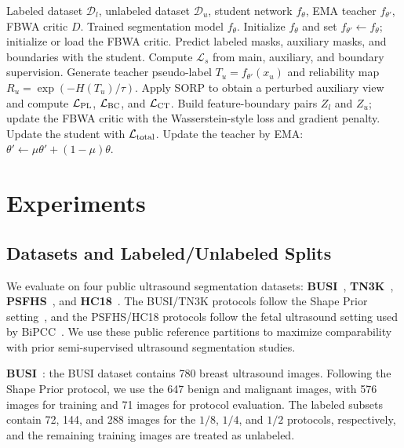 \documentclass[a4paper,fleqn]{cas-dc}
\begin{document}
\begin{algorithm}[t]
\caption{BRACE Boundary-Reliability Knowledge Alignment Procedure}
\label{alg:training}
\begin{algorithmic}[1]
\REQUIRE Labeled dataset $\mathcal{D}_l$, unlabeled dataset $\mathcal{D}_u$, student network $f_\theta$, EMA teacher $f_{\theta'}$, FBWA critic $D$.
\ENSURE Trained segmentation model $f_\theta$.
\STATE Initialize $f_\theta$ and set $f_{\theta'} \leftarrow f_\theta$; initialize or load the FBWA critic.
        \STATE Predict labeled masks, auxiliary masks, and boundaries with the student.
        \STATE Compute $\mathcal{L}_s$ from main, auxiliary, and boundary supervision.
        \STATE Generate teacher pseudo-label $T_u=f_{\theta'}(x_u)$ and reliability map $R_u=\exp(-H(T_u)/\tau)$.
        \STATE Apply SORP to obtain a perturbed auxiliary view and compute $\mathcal{L}_{\rm PL}$, $\mathcal{L}_{\rm BC}$, and $\mathcal{L}_{\rm CT}$.
        \STATE Build feature-boundary pairs $Z_l$ and $Z_u$; update the FBWA critic with the Wasserstein-style loss and gradient penalty.
        \STATE Update the student with $\mathcal{L}_{\rm total}$.
        \STATE Update the teacher by EMA: $\theta' \leftarrow \mu\theta' + (1-\mu)\theta$.
    \ENDFOR
\ENDFOR
\end{algorithmic}
\end{algorithm}

\section{Experiments}

\subsection{Datasets and Labeled/Unlabeled Splits}

We evaluate on four public ultrasound segmentation datasets: \textbf{BUSI}~\cite{b1}, \textbf{TN3K}~\cite{b4}, \textbf{PSFHS}~\cite{b53}, and \textbf{HC18}~\cite{b54}. The BUSI/TN3K protocols follow the Shape Prior setting~\cite{b2}, and the PSFHS/HC18 protocols follow the fetal ultrasound setting used by BiPCC~\cite{b51}. We use these public reference partitions to maximize comparability with prior semi-supervised ultrasound segmentation studies.

\textbf{BUSI}~\cite{b1}: the BUSI dataset contains 780 breast ultrasound images. Following the Shape Prior protocol, we use the 647 benign and malignant images, with 576 images for training and 71 images for protocol evaluation. The labeled subsets contain 72, 144, and 288 images for the $1/8$, $1/4$, and $1/2$ protocols, respectively, and the remaining training images are treated as unlabeled.
\end{document}
